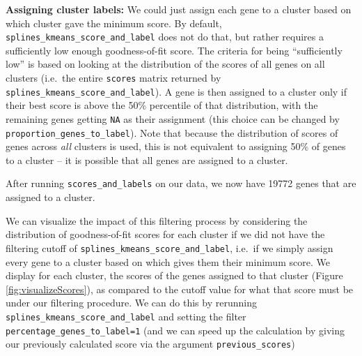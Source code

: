 \documentclass[9pt,a4paper,]{extarticle}
\newenvironment{Shaded}{\begin{snugshade}}{\end{snugshade}}
\newcommand{\CommentTok}[1]{\textcolor[rgb]{0.56,0.35,0.01}{\textit{#1}}}
\newcommand{\KeywordTok}[1]{\textcolor[rgb]{0.13,0.29,0.53}{\textbf{#1}}}
\newcommand{\NormalTok}[1]{#1}
\newcommand{\OperatorTok}[1]{\textcolor[rgb]{0.81,0.36,0.00}{\textbf{#1}}}
\newcommand{\StringTok}[1]{\textcolor[rgb]{0.31,0.60,0.02}{#1}}
\begin{document}
\textbf{Assigning cluster labels:} We could just assign each gene to a cluster
based on which cluster gave the minimum score. By default,
\texttt{splines\_kmeans\_score\_and\_label} does not do that, but rather requires a
sufficiently low enough goodness-of-fit score. The criteria for being
``sufficiently low'' is based on looking at the distribution of the scores of
all genes on all clusters (i.e.~the entire \texttt{scores} matrix returned by
\texttt{splines\_kmeans\_score\_and\_label}). A gene is then assigned to a cluster only
if their best score is above the 50\% percentile of that distribution, with the
remaining genes getting \texttt{NA} as their assignment (this choice can be changed
by \texttt{proportion\_genes\_to\_label}). Note that because the distribution of scores
of genes across \emph{all} clusters is used, this is not equivalent to assigning
50\% of genes to a cluster -- it is possible that all genes are assigned to a
cluster.

\begin{Shaded}
\end{Shaded}

After running \texttt{scores\_and\_labels} on our data, we now have 19772 genes that
are assigned to a cluster.

We can visualize the impact of this filtering process by considering the
distribution of goodness-of-fit scores for each cluster if we did not have the
filtering cutoff of \texttt{splines\_kmeans\_score\_and\_label}, i.e.~if we simply assign
every gene to a cluster based on which gives them their minimum score. We
display for each cluster, the scores of the genes assigned to that cluster
(Figure \ref{fig:visualizeScores}), as compared to the cutoff value for what
that score must be under our filtering procedure. We can do this by rerunning
\texttt{splines\_kmeans\_score\_and\_label} and setting the filter
\texttt{percentage\_genes\_to\_label=1} (and we can speed up the calculation by giving
our previously calculated score via the argument \texttt{previous\_scores})
\end{document}
